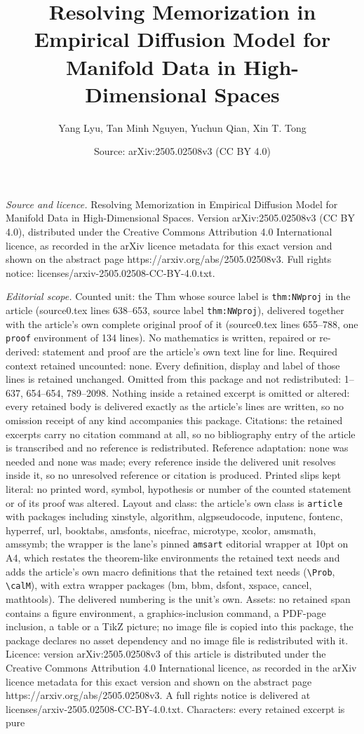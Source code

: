 \documentclass[10pt,a4paper]{amsart}
\title[Resolving Memorization in Empirical Diffusion Model for Mani]{Resolving Memorization in Empirical Diffusion Model for Manifold Data in High-Dimensional Spaces}
\author{Yang Lyu, Tan Minh Nguyen, Yuchun Qian, Xin T. Tong}
\date{Source: arXiv:2505.02508v3 (CC BY 4.0)}
\begin{document}
\maketitle

\noindent\emph{Source and licence.} Resolving Memorization in Empirical Diffusion Model for Manifold Data in High-Dimensional Spaces. Version arXiv:2505.02508v3 (CC BY 4.0), distributed under the Creative Commons Attribution 4.0 International licence, as recorded in the arXiv licence metadata for this exact version and shown on the abstract page https://arxiv.org/abs/2505.02508v3. Full rights notice: licenses/arxiv-2505.02508-CC-BY-4.0.txt.\par\smallskip

\noindent\textit{Editorial scope.} Counted unit: the Thm whose source label is \texttt{thm:NWproj} in the article (source0.tex lines 638--653, source label \texttt{thm:NWproj}), delivered together with the article's own complete original proof of it (source0.tex lines 655--788, one \texttt{proof} environment of 134 lines). No mathematics is written, repaired or re-derived: statement and proof are the article's own text line for line. Required context retained uncounted: none. Every definition, display and label of those lines is retained unchanged. Omitted from this package and not redistributed: 1--637, 654--654, 789--2098. Nothing inside a retained excerpt is omitted or altered: every retained body is delivered exactly as the article's lines are written, so no omission receipt of any kind accompanies this package. Citations: the retained excerpts carry no citation command at all, so no bibliography entry of the article is transcribed and no reference is redistributed. Reference adaptation: none was needed and none was made; every reference inside the delivered unit resolves inside it, so no unresolved reference or citation is produced. Printed slips kept literal: no printed word, symbol, hypothesis or number of the counted statement or of its proof was altered. Layout and class: the article's own class is \texttt{article} with packages including xinstyle, algorithm, algpseudocode, inputenc, fontenc, hyperref, url, booktabs, amsfonts, nicefrac, microtype, xcolor, amsmath, amssymb; the wrapper is the lane's pinned \texttt{amsart} editorial wrapper at 10pt on A4, which restates the theorem-like environments the retained text needs and adds the article's own macro definitions that the retained text needs (\texttt{\textbackslash Prob}, \texttt{\textbackslash calM}), with extra wrapper packages (bm, bbm, dsfont, xspace, cancel, mathtools). The delivered numbering is the unit's own. Assets: no retained span contains a figure environment, a graphics-inclusion command, a PDF-page inclusion, a table or a TikZ picture; no image file is copied into this package, the package declares no asset dependency and no image file is redistributed with it. Licence: version arXiv:2505.02508v3 of this article is distributed under the Creative Commons Attribution 4.0 International licence, as recorded in the arXiv licence metadata for this exact version and shown on the abstract page https://arxiv.org/abs/2505.02508v3. A full rights notice is delivered at licenses/arxiv-2505.02508-CC-BY-4.0.txt. Characters: every retained excerpt is pure 
\end{document}
